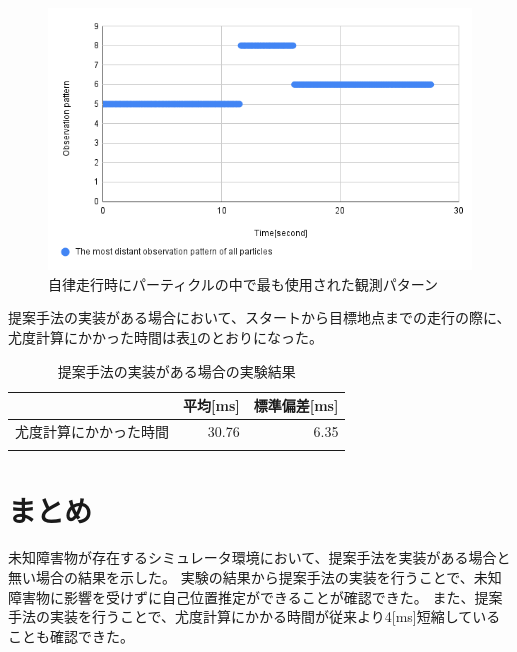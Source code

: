 \begin{figure}[h]
  \begin{center}
    \includegraphics[width=0.98\linewidth]{figs/sim_imp_ob_pattern.png}
    \caption{自律走行時にパーティクルの中で最も使用された観測パターン}
    \label{fig:obs_pattern_sim}
  \end{center}
\end{figure}

提案手法の実装がある場合において、スタートから目標地点までの走行の際に、
尤度計算にかかった時間は表\ref{tabule:likelihood_calc_time_sim_imp}のとおりになった。

\begin{table}[ht]
  \begin{center}
    \caption{提案手法の実装がある場合の実験結果}
    \label{tabule:likelihood_calc_time_sim_imp}
    \begin{tabular}{l|r|r} 
      \thline
      & 平均[ms] &  標準偏差[ms] \\
      \hline
      尤度計算にかかった時間 & 30.76 & 6.35 \\
      \thline
    \end{tabular}
  \end{center}
\end{table}

\section{まとめ}
未知障害物が存在するシミュレータ環境において、提案手法を実装がある場合と無い場合の結果を示した。
実験の結果から提案手法の実装を行うことで、未知障害物に影響を受けずに自己位置推定ができることが確認できた。
また、提案手法の実装を行うことで、尤度計算にかかる時間が従来より4[ms]短縮していることも確認できた。